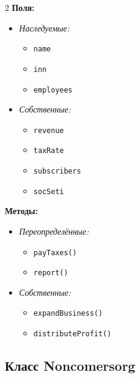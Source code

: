 \documentclass[oneside,a4paper,14pt]{extarticle}
\begin{document}
\begin{paracol}{2}
  \textbf{Поля:}
  \begin{itemize}
    \item \textit{Наследуемые:}
      \begin{itemize}
        \item \texttt{name}
        \item \texttt{inn}
        \item \texttt{employees}
      \end{itemize}
    \item \textit{Собственные:}
      \begin{itemize}
        \item \texttt{revenue}
        \item \texttt{taxRate}
        \item \texttt{subscribers}
        \item \texttt{socSeti}
      \end{itemize}
  \end{itemize}

  \switchcolumn
  \textbf{Методы:}
  \begin{itemize}
    \item \textit{Переопределённые:}
      \begin{itemize}
        \item \texttt{payTaxes()}
        \item \texttt{report()}
      \end{itemize}
    \item \textit{Собственные:}
      \begin{itemize}
        \item \texttt{expandBusiness()}
        \item \texttt{distributeProfit()}
      \end{itemize}
  \end{itemize}
\end{paracol}

\newpage
\subsection*{\hfil Класс Noncomersorg}
\end{document}
